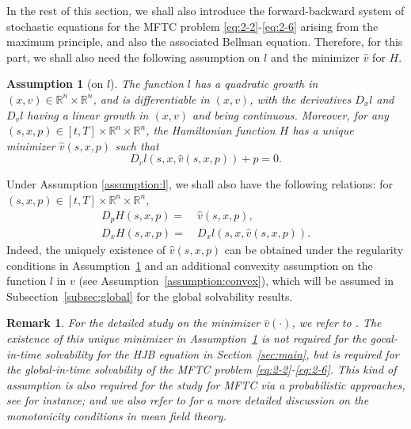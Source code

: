 \documentclass[11pt]{article}
\numberwithin{equation}{section}
\newtheorem{assumption}{Assumption}[section]
\newtheorem{remark}{Remark}[section]
\newcommand{\brn}{{\mathbb{R}^n}}
\newcommand{\1}{\mbox{1\hspace{-1mm}I}}
\begin{document}
In the rest of this section, we shall also introduce the forward-backward system of stochastic equations for the MFTC problem \eqref{eq:2-2}-\eqref{eq:2-6} arising from the maximum principle, and also the associated Bellman equation. %
Therefore, for this part, we shall also need the following assumption on $l$ and the minimizer $\widehat{v}$ for $H$. 

\begin{assumption}[on $l$] \label{assumption:l}
    The function $l$ has a quadratic growth in $(x,v)\in\brn\times\brn$, and is differentiable in $(x,v)$, with the derivatives $D_xl$ and $D_vl$ having a linear growth in $(x,v)$ and being continuous. Moreover, for any $(s,x,p)\in[t,T]\times\brn\times\brn$, the Hamiltonian function $H$ has a unique minimizer $\widehat{v}(s,x,p)$ such that 
    \begin{equation}\label{def:hat_v}
        D_v l\left(s,x,\widehat{v}(s,x,p)\right)+p=0.
    \end{equation}
\end{assumption}

Under Assumption \eqref{assumption:l}, we shall also have the following relations: for $(s,x,p)\in[t,T]\times\brn\times\brn$,
\begin{equation}\label{D_pH}
    \begin{aligned}
        D_p H(s,x,p)=\ & \widehat{v}(s,x,p), \\
        D_x H(s,x,p)=\ & D_x l\left(s,x,\widehat{v}(s,x,p)\right).
    \end{aligned}
\end{equation}
Indeed, the uniquely existence of $\widehat{v}(s,x,p)$ can be obtained under the regularity conditions in Assumption~\ref{assumption:l} and an additional convexity assumption on the function $l$ in $v$ (see Assumption~\ref{assumption:convex}), which will be assumed in Subsection~\ref{subsec:global} for the global solvability results.

\begin{remark}
    For the detailed study on the minimizer $\widehat{v}(\cdot)$, we refer to \cite[Proposition 5.4]{AB10''}. The existence of this unique minimizer in Assumption~\ref{assumption:l} is not required for the gocal-in-time solvability for the HJB equation in Section~\ref{sec:main}, but is required for the global-in-time solvability of the MFTC problem \eqref{eq:2-2}-\eqref{eq:2-6}. This kind of assumption is also required for the study for MFTC via a probabilistic approaches, see \cite{AB10,AB5} for instance; and we also refer to \cite{AB12} for a more detailed discussion on the monotonicity conditions in mean field theory. 
\end{remark}
\end{document}
